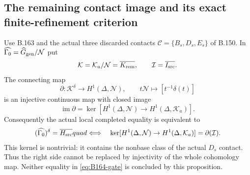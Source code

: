 \subsection*{The remaining contact image and its exact finite-refinement criterion}
\label{stmt:B164}
Use B.163 and the actual three discarded contacts
$\mathscr C=\{B_s,D_s,E_s\}$ of B.150. In
$\widehat{\Gamma_0}=\widehat G_{\rm gen}/\mathcal N$ put
\[
 \mathcal K=\mathcal K_a/\mathcal N=\overline{K_{\rm rem}},\qquad
 \mathcal I=\overline{I_{\rm src}}.
\]
The connecting map
\begin{equation}\label{eq:B164-connecting}
 \partial:\mathcal K^\delta\longrightarrow H^1(\Delta,\mathcal N),
 \qquad t\mathcal N\longmapsto[t^{-1}\delta(t)]
\end{equation}
is an injective continuous map with closed image
\[
 \operatorname{im}\partial
   =\ker[H^1(\Delta,\mathcal N)\to H^1(\Delta,\mathcal K_a)].
\]
Consequently the actual local completed equality is equivalent to
\begin{equation}\label{eq:B164-gate}
 (\widehat{\Gamma_0})^\delta=\overline{H_{\rm src}}quad
 \Longleftrightarrow\quad
 \ker[H^1(\Delta,\mathcal N)\to H^1(\Delta,\mathcal K_a)]
          =\partial(\mathcal I).
\end{equation}
This kernel is nontrivial: it contains the nonbase class of the actual
$D_s$ contact. Thus the right side cannot be replaced by injectivity
of the whole cohomology map. Neither equality in
\eqref{eq:B164-gate} is concluded by this proposition.
